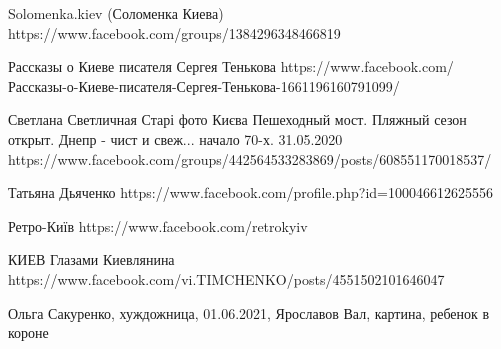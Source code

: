  
 
 
 
 


Solomenka.kiev (Соломенка Киева)
https://www.facebook.com/groups/1384296348466819

Рассказы о Киеве писателя Сергея Тенькова
https://www.facebook.com/Рассказы-о-Киеве-писателя-Сергея-Тенькова-1661196160791099/

Светлана Светличная
Старі фото Києва
Пешеходный мост. Пляжный сезон открыт. Днепр - чист и свеж... начало 70-х.
31.05.2020
https://www.facebook.com/groups/442564533283869/posts/608551170018537/

Татьяна Дьяченко
https://www.facebook.com/profile.php?id=100046612625556

Ретро-Київ
https://www.facebook.com/retrokyiv

КИЕВ Глазами Киевлянина
https://www.facebook.com/vi.TIMCHENKO/posts/4551502101646047

Ольга Сакуренко, хуждожница, 01.06.2021, Ярославов Вал, картина, ребенок в короне
